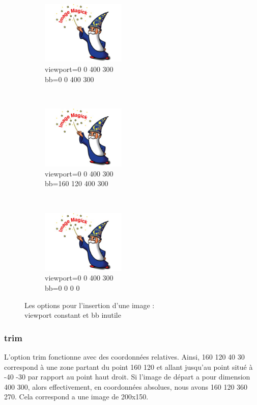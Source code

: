 \begin{figure}[h]
    \centering
    \begin{subfigure}[b]{0.3\textwidth}
        \includegraphics[viewport=0 0 400 300,bb=0 0 400 300,width=4cm,height=3cm,clip=true]{test.jpg}
        \caption{viewport=0 0 400 300\\bb=0 0 400 300}
        \label{essai_a}
    \end{subfigure}
    ~
    \begin{subfigure}[b]{0.3\textwidth}
        \includegraphics[viewport=0 0 400 300,bb=160 120 400 300,width=4cm,height=3cm,clip=true]{test.jpg}
        \caption{viewport=0 0 400 300\\bb=160 120 400 300}
        \label{essai_2}
    \end{subfigure}
    ~
    \begin{subfigure}[b]{0.3\textwidth}
        \includegraphics[viewport=0 0 400 300,bb=0 0 0 0,width=4cm,height=3cm,clip=true]{test.jpg}
        \caption{viewport=0 0 400 300\\bb=0 0 0 0}
        \label{essai_3}
    \end{subfigure}
    \caption{Les options pour l'insertion d'une image :\\viewport constant et bb inutile}%
    \label{viewport constant et bb inutile}

\end{figure}

\subsubsection{trim}
L'option trim fonctionne avec des coordonnées relatives.
Ainsi, {160 120 40 30} correspond à une zone partant du point {160 120}
et allant jusqu'au point situé à {-40 -30} par rapport au point haut droit.
Si l'image de départ a pour dimension {400 300}, alors effectivement, 
en coordonnées absolues, nous avons {160 120 360 270}.
Cela correspond a une image de 200x150.

